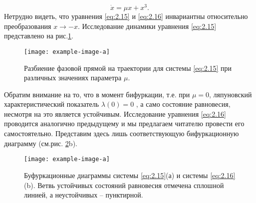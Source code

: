 \begin{equation}
    \label{eq:2.16}
    \dot x = \mu x + x^3.
\end{equation}
Нетрудно видеть, что уравнения \eqref{eq:2.15} и \eqref{eq:2.16} инвариантны относительно преобразования $x \rightarrow -x$. Исследование динамики уравнения \eqref{eq:2.15} представлено на рис.\ref{fig:2.9}.
\begin{figure}[h!]
    \centering
    \texttt{[image: example-image-a]}
    \caption{Разбиение фазовой прямой на траектории для системы \eqref{eq:2.15} при различных значениях параметра $\mu$. }
    \label{fig:2.9}
\end{figure}
Обратим внимание на то, что в момент бифуркации, т.е. при $\mu=0$, ляпуновский характеристический показатель $\lambda(0) = 0$ , а само состояние равновесия, несмотря на это является устойчивым. Исследование уравнения \eqref{eq:2.16} проводится аналогично предыдущему и мы предлагаем читателю провести его самостоятельно. Представим здесь лишь соответствующую бифуркационную диаграмму (см.рис. \ref{fig:2.10}b).
\begin{figure}[h!]
    \centering
    \texttt{[image: example-image-a]}
    \caption{Буфуркационные диаграммы системы \eqref{eq:2.15}(а) и системы \eqref{eq:2.16}(b).
    Ветвь устойчивых состояний равновесия отмечена сплошной линией, а неустойчивых -- пунктирной.}
    \label{fig:2.10}
\end{figure}
